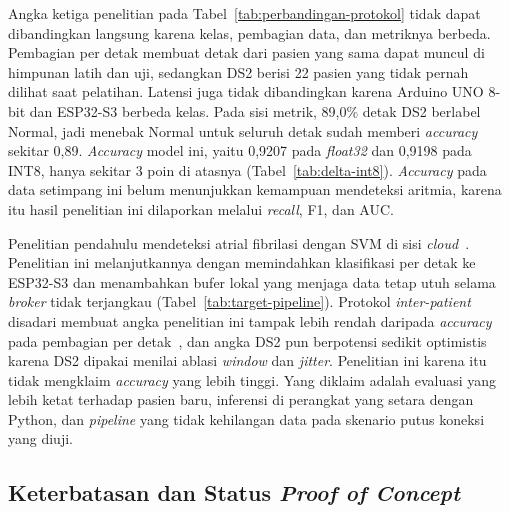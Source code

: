 Angka ketiga penelitian pada Tabel~\ref{tab:perbandingan-protokol} tidak dapat dibandingkan langsung karena kelas, pembagian data, dan metriknya berbeda. Pembagian per detak membuat detak dari pasien yang sama dapat muncul di himpunan latih dan uji, sedangkan DS2 berisi 22 pasien yang tidak pernah dilihat saat pelatihan. Latensi juga tidak dibandingkan karena Arduino UNO 8-bit dan ESP32-S3 berbeda kelas. Pada sisi metrik, 89,0\% detak DS2 berlabel Normal, jadi menebak Normal untuk seluruh detak sudah memberi \textit{accuracy} sekitar 0,89. \textit{Accuracy} model ini, yaitu 0,9207 pada \textit{float32} dan 0,9198 pada INT8, hanya sekitar 3 poin di atasnya (Tabel~\ref{tab:delta-int8}). \textit{Accuracy} pada data setimpang ini belum menunjukkan kemampuan mendeteksi aritmia, karena itu hasil penelitian ini dilaporkan melalui \textit{recall}, F1, dan AUC.

Penelitian pendahulu mendeteksi atrial fibrilasi dengan SVM di sisi \textit{cloud}~\cite{mulyawan_2026}. Penelitian ini melanjutkannya dengan memindahkan klasifikasi per detak ke ESP32-S3 dan menambahkan bufer lokal yang menjaga data tetap utuh selama \textit{broker} tidak terjangkau (Tabel~\ref{tab:target-pipeline}). Protokol \textit{inter-patient} disadari membuat angka penelitian ini tampak lebih rendah daripada \textit{accuracy} pada pembagian per detak~\cite{xiao_2023}, dan angka DS2 pun berpotensi sedikit optimistis karena DS2 dipakai menilai ablasi \textit{window} dan \textit{jitter}. Penelitian ini karena itu tidak mengklaim \textit{accuracy} yang lebih tinggi. Yang diklaim adalah evaluasi yang lebih ketat terhadap pasien baru, inferensi di perangkat yang setara dengan Python, dan \textit{pipeline} yang tidak kehilangan data pada skenario putus koneksi yang diuji.

\subsection{Keterbatasan dan Status \textit{Proof of Concept}}

